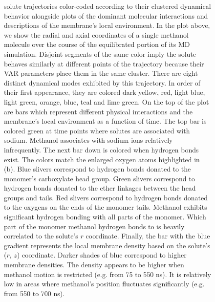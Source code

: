 \documentclass{article}
\begin{document}
\begin{figure}
{  solute trajectories color-coded according to their clustered dynamical behavior alongside
  plots of the dominant molecular interactions and descriptions of the membrane's local 
  environment. In the plot above, we show the radial and axial coordinates of a single
  methanol molecule over the course of the equilibrated portion of its MD simulation.
  Disjoint segments of the same color imply the solute behaves similarly at different 
  points of the trajectory because their VAR parameters place them in the same cluster. 
  There are eight distinct dynamical modes exhibited by this trajectory. In order
  of their first appearance, they are colored dark yellow, red, light blue, light green,
  orange, blue, teal and lime green. On the top of the plot are bars which represent different
  physical interactions and the membrane's local environment as a function of time. The top 
  bar is colored green at time points where solutes are associated with sodium. Methanol 
  associates with sodium ions relatively infrequently. The next bar down is colored when hydrogen
  bonds exist. The colors match the enlarged oxygen atoms highlighted in (b). Blue slivers
  correspond to hydrogen bonds donated to the monomer's carboxylate head group. Green slivers
  correspond to  hydrogen bonds donated to the ether linkages between the head groups
  and tails. Red slivers correspond to hydrogen bonds donated to the oxygens on the ends
  of the monomer tails. Methanol exhibits significant hydrogen bonding with all parts of
  the monomer. Which part of the monomer methanol hydrogen bonds to is heavily correlated
  to the solute's $r$ coordinate. Finally, the bar with the blue gradient represents the local 
  membrane density based on the solute's ($r$, $z$) coordinate. Darker shades of blue
  correspond to higher membrane densities. The density appears to be higher when methanol
  motion is restricted (e.g. from 75 to 550 ns). It is relatively low in areas where methanol's
  position fluctuates significantly (e.g. from 550 to 700 ns). 
  }\label{fig:mechanism_map}
  \end{figure}
\end{document}

